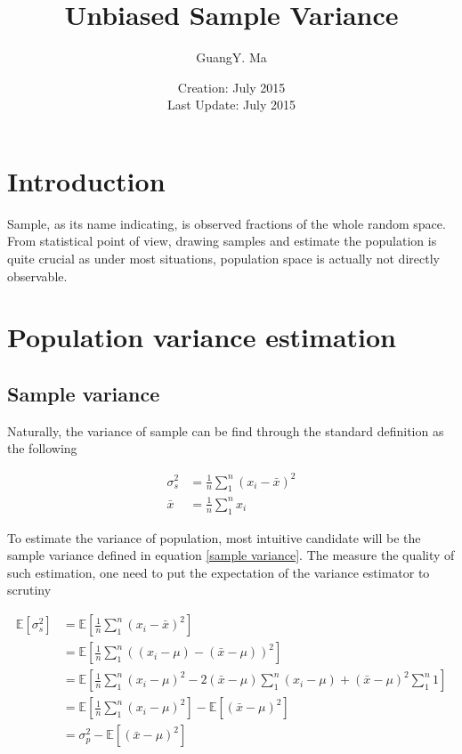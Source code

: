 \documentclass{article}
\title{Unbiased Sample Variance}
\author{GuangY. Ma}
\date{Creation: July 2015 \\ Last Update: July 2015}
\begin{document}
\maketitle

\section{Introduction}

Sample, as its name indicating, is observed fractions of the whole random space. From statistical point of view, drawing samples and estimate the population is quite crucial as under most situations, population space is actually not directly observable.

\section{Population variance estimation}



\subsection{Sample variance}

Naturally, the variance of sample can be find through the standard definition as the following

\begin{align}
    \sigma_s^2 &= \frac{1}{n} \sum_1^n {(x_i - \bar{x})^2} \label{sample variance} \\
    \bar{x} &= \frac{1}{n} \sum_1^n {x_i} \label{sample mean}
\end{align}

To estimate the variance of population, most intuitive candidate will be the sample variance defined in equation \ref{sample variance}. The measure the quality of such estimation, one need to put the expectation of the variance estimator to scrutiny

\begin{align} \label{biased sample variance}
    \mathbb{E}\left[\sigma_s^2\right] &= \mathbb{E} \left[\frac{1}{n} \sum_1^n {(x_i - \bar{x})^2}\right] \nonumber \\
    &= \mathbb{E} \left[\frac{1}{n} \sum_1^n{\left(\left(x_i - \mu\right) - \left(\bar{x} - \mu\right)\right)^2}\right] \nonumber \\
    &= \mathbb{E} \left[\frac{1}{n} \sum_1^n{\left(x_i - \mu\right)^2} - 2 \left(\bar{x} - \mu\right) \sum_1^n{\left(x_i - \mu\right)}   + \left(\bar{x} - \mu\right)^2 \sum_1^n{1}\right] \nonumber \\
    &= \mathbb{E} \left[\frac{1}{n} \sum_1^n{(x_i - \mu)^2}\right] - \mathbb{E} \left[(\bar{x} - \mu)^2\right] \nonumber \\
    &= \sigma_p^2 - \mathbb{E} \left[(\bar{x} - \mu)^2\right]
\end{align}
\end{document}
